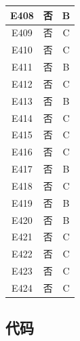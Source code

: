 \documentclass[UTF8]{ctexart}
\begin{document}
\begin{center}
\begin{longtable}{|c|c|c|}
		E408     & 否       & B        \\ \hline
		E409     & 否       & C        \\ \hline
		E410     & 否       & C        \\ \hline
		E411     & 否       & B        \\ \hline
		E412     & 否       & C        \\ \hline
		E413     & 否       & B        \\ \hline
		E414     & 否       & C        \\ \hline
		E415     & 否       & C        \\ \hline
		E416     & 否       & C        \\ \hline
		E417     & 否       & B        \\ \hline
		E418     & 否       & C        \\ \hline
		E419     & 否       & B        \\ \hline
		E420     & 否       & B        \\ \hline
		E421     & 否       & C        \\ \hline
		E422     & 否       & C        \\ \hline
		E423     & 否       & C        \\ \hline
		E424     & 否       & C        \\ \hline
	\end{longtable}
\end{center}

\newpage

\subsection{代码}
\end{document}
